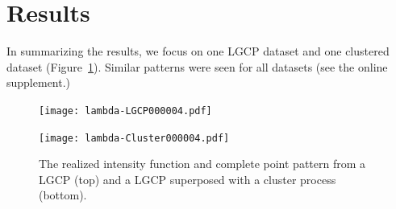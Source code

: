 \documentclass[review]{elsarticle}
\begin{document}
\section{Results}




In summarizing the results, we focus on one LGCP dataset and one clustered
dataset (Figure~\ref{fulldata}). Similar patterns were seen for all datasets
(see the online supplement.)

\begin{figure}
\texttt{[image: lambda-LGCP000004.pdf]}

\texttt{[image: lambda-Cluster000004.pdf]}

\caption{The realized intensity function and complete point pattern from a LGCP
(top) and a LGCP superposed with a cluster process (bottom).}
\label{fulldata}
\end{figure}
\end{document}
